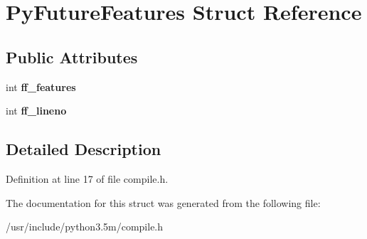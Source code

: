 \hypertarget{structPyFutureFeatures}{}\section{Py\+Future\+Features Struct Reference}
\label{structPyFutureFeatures}
\subsection*{Public Attributes}
\begin{DoxyCompactItemize}
\item 
int {\bfseries ff\+\_\+features}\hypertarget{structPyFutureFeatures_ae87ffcf41926116dcd91cfcee3608ba3}{}\label{structPyFutureFeatures_ae87ffcf41926116dcd91cfcee3608ba3}

\item 
int {\bfseries ff\+\_\+lineno}\hypertarget{structPyFutureFeatures_acef68f58394a40dbdac8c00229d2b317}{}\label{structPyFutureFeatures_acef68f58394a40dbdac8c00229d2b317}

\end{DoxyCompactItemize}


\subsection{Detailed Description}


Definition at line 17 of file compile.\+h.



The documentation for this struct was generated from the following file\+:\begin{DoxyCompactItemize}
\item 
/usr/include/python3.\+5m/compile.\+h\end{DoxyCompactItemize}

